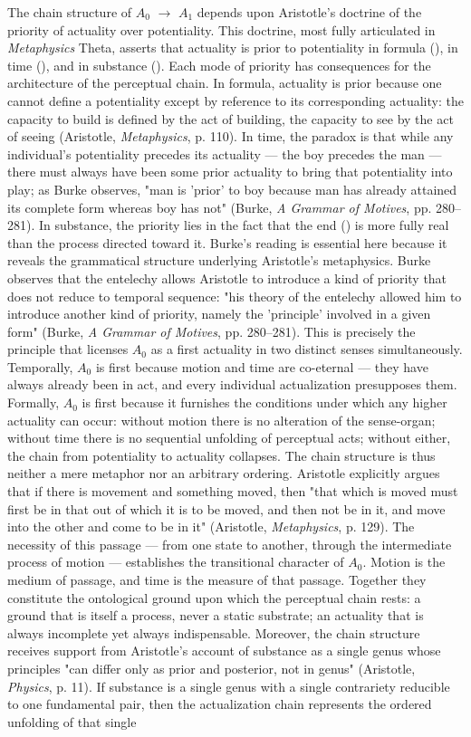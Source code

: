 The chain structure of $A_0$ $\to$ $A_1$ depends upon Aristotle's doctrine of the priority of actuality over potentiality. This doctrine, most fully articulated in \textit{Metaphysics} Theta, asserts that actuality is prior to potentiality in formula (), in time (), and in substance (). Each mode of priority has consequences for the architecture of the perceptual chain. In formula, actuality is prior because one cannot define a potentiality except by reference to its corresponding actuality: the capacity to build is defined by the act of building, the capacity to see by the act of seeing (Aristotle, \textit{Metaphysics}, p. 110). In time, the paradox is that while any individual's potentiality precedes its actuality --- the boy precedes the man --- there must always have been some prior actuality to bring that potentiality into play; as Burke observes, "man is 'prior' to boy because man has already attained its complete form whereas boy has not" (Burke, \textit{A Grammar of Motives}, pp. 280--281). In substance, the priority lies in the fact that the end () is more fully real than the process directed toward it. Burke's reading is essential here because it reveals the grammatical structure underlying Aristotle's metaphysics. Burke observes that the entelechy allows Aristotle to introduce a kind of priority that does not reduce to temporal sequence: "his theory of the entelechy allowed him to introduce another kind of priority, namely the 'principle' involved in a given form" (Burke, \textit{A Grammar of Motives}, pp. 280--281). This is precisely the principle that licenses $A_0$ as a first actuality in two distinct senses simultaneously. Temporally, $A_0$ is first because motion and time are co-eternal --- they have always already been in act, and every individual actualization presupposes them. Formally, $A_0$ is first because it furnishes the conditions under which any higher actuality can occur: without motion there is no alteration of the sense-organ; without time there is no sequential unfolding of perceptual acts; without either, the chain from potentiality to actuality collapses. The chain structure is thus neither a mere metaphor nor an arbitrary ordering. Aristotle explicitly argues that if there is movement and something moved, then "that which is moved must first be in that out of which it is to be moved, and then not be in it, and move into the other and come to be in it" (Aristotle, \textit{Metaphysics}, p. 129). The necessity of this passage --- from one state to another, through the intermediate process of motion --- establishes the transitional character of $A_0$. Motion is the medium of passage, and time is the measure of that passage. Together they constitute the ontological ground upon which the perceptual chain rests: a ground that is itself a process, never a static substrate; an actuality that is always incomplete yet always indispensable. Moreover, the chain structure receives support from Aristotle's account of substance as a single genus whose principles "can differ only as prior and posterior, not in genus" (Aristotle, \textit{Physics}, p. 11). If substance is a single genus with a single contrariety reducible to one fundamental pair, then the actualization chain represents the ordered unfolding of that single 